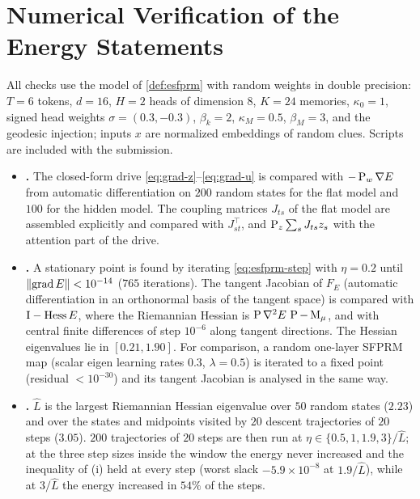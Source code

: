 \section{Numerical Verification of the Energy Statements}
\label{app:energy-numerics}

All checks use the model of \cref{def:esfprm} with random weights in double precision: $T=6$ tokens,
$d=16$, $H=2$ heads of dimension $8$, $K=24$ memories, $\kappa_0=1$, signed head weights
$\sigma=(0.3,-0.3)$, $\beta_k=2$, $\kappa_M=0.5$, $\beta_M=3$, and the geodesic injection; inputs
$x$ are normalized embeddings of random clues. Scripts are included with the submission.
\begin{itemize}
  \item \textbf{.} The closed-form drive \eqref{eq:grad-z}--\eqref{eq:grad-u}
  is compared with $-\operatorname{P}_w\nabla E$ from automatic differentiation on $200$ random states for the
  flat model and $100$ for the hidden model. The coupling matrices $J_{ts}$ of the flat model are
  assembled explicitly and compared with $J_{st}^\top$, and $\operatorname{P}_z\sum_sJ_{ts}z_s$ with the attention
  part of the drive.
  \item \textbf{.} A stationary point is found by iterating
  \eqref{eq:esfprm-step} with $\eta=0.2$ until $\lVert \operatorname{grad} E\rVert<10^{-14}$ ($765$ iterations). The
  tangent Jacobian of $F_E$ (automatic differentiation in an orthonormal basis of the tangent space)
  is compared with $\mathrm{I}-\operatorname{Hess}E$, where the Riemannian Hessian is
  $\operatorname{P}\nabla^2E\,\operatorname{P}-\operatorname{M}_\mu$, and with central finite differences of step $10^{-6}$
  along tangent directions. The Hessian eigenvalues lie in $[0.21,1.90]$. For comparison, a random
  one-layer SFPRM map (scalar eigen learning rates $0.3$, $\lambda=0.5$) is iterated to a fixed point
  (residual $<10^{-30}$) and its tangent Jacobian is analysed in the same way.
  \item \textbf{.} $\hat L$ is the largest Riemannian Hessian eigenvalue over $50$
  random states ($2.23$) and over the states and midpoints visited by $20$ descent trajectories of
  $20$ steps ($3.05$). $200$ trajectories of $20$ steps are then run at
  $\eta\in\{0.5,1,1.9,3\}/\hat L$; at the three step sizes inside the window the energy never
  increased and the inequality of (i) held at every step (worst slack $-5.9\times10^{-8}$ at
  $1.9/\hat L$), while at $3/\hat L$ the energy increased in $54\%$ of the steps.

\end{itemize}
